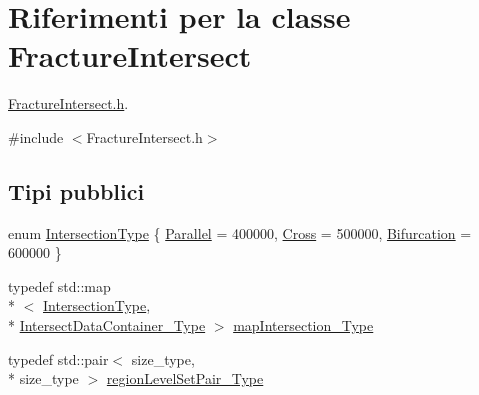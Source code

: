 \hypertarget{classFractureIntersect}{\section{Riferimenti per la classe Fracture\-Intersect}
\label{classFractureIntersect}
}


\hyperlink{FractureIntersect_8h}{Fracture\-Intersect.\-h}.  




{\ttfamily \#include $<$Fracture\-Intersect.\-h$>$}

\subsection*{Tipi pubblici}
\begin{DoxyCompactItemize}
\item 
enum \hyperlink{classFractureIntersect_a9a4e4a784fa4c8e359767ed543f89dc5}{Intersection\-Type} \{ \hyperlink{classFractureIntersect_a9a4e4a784fa4c8e359767ed543f89dc5ad91760e1506b52a828bc401490f7c92b}{Parallel} = 400000, 
\hyperlink{classFractureIntersect_a9a4e4a784fa4c8e359767ed543f89dc5a743fef1af81c0e61412fafb9438b380e}{Cross} = 500000, 
\hyperlink{classFractureIntersect_a9a4e4a784fa4c8e359767ed543f89dc5a4d466b3d3de0af7e18732b6f765bb1af}{Bifurcation} = 600000
 \}
\item 
typedef std\-::map\\*
$<$ \hyperlink{classFractureIntersect_a9a4e4a784fa4c8e359767ed543f89dc5}{Intersection\-Type}, \\*
\hyperlink{IntersectData_8h_a822ec3b760dfb603e1cf0bfe3ad5636a}{Intersect\-Data\-Container\-\_\-\-Type} $>$ \hyperlink{classFractureIntersect_a4eea7d0aca48cdd36ea1756e75280332}{map\-Intersection\-\_\-\-Type}
\item 
typedef std\-::pair$<$ size\-\_\-type, \\*
size\-\_\-type $>$ \hyperlink{classFractureIntersect_aea039e89cb4b4314c25c7a362641f40e}{region\-Level\-Set\-Pair\-\_\-\-Type}
\end{DoxyCompactItemize}
